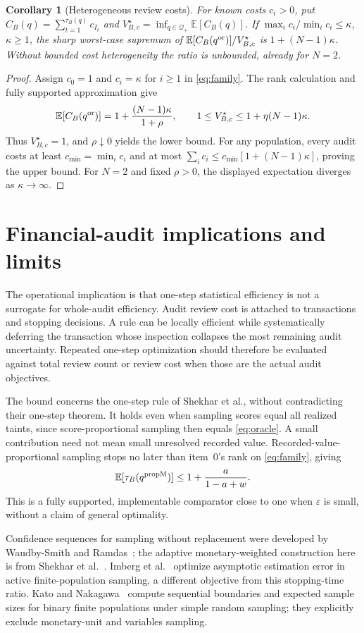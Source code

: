 \documentclass[11pt]{article}
\newtheorem{corollary}[theorem]{Corollary}
\newcommand{\E}{\mathbb{E}}
\begin{document}
\begin{corollary}[Heterogeneous review costs]\label{cor:cost}
For known costs $c_i>0$, put
$C_B(q)=\sum_{t=1}^{\tau_B(q)}c_{I_t}$ and
$V_{B,c}^\star=\inf_{q\in\mathcal Q_+}\E[C_B(q)]$.
If $\max_i c_i/\min_i c_i\le\kappa$, $\kappa\ge1$, the sharp worst-case
supremum of $\E[C_B(q^{\rm or})]/V_{B,c}^\star$ is $1+(N-1)\kappa$.
Without bounded cost heterogeneity the ratio is unbounded, already for $N=2$.
\end{corollary}
\begin{proof}
Assign $c_0=1$ and $c_i=\kappa$ for $i\ge1$ in \eqref{eq:family}.
The rank calculation and fully supported approximation give
\[
 \E[C_B(q^{\rm or})]=1+\frac{(N-1)\kappa}{1+\rho},\qquad
 1\le V_{B,c}^\star\le1+\eta(N-1)\kappa.
\]
Thus $V_{B,c}^\star=1$, and $\rho\downarrow0$ yields the lower bound.
For any population, every audit costs at least $c_{\min}=\min_i c_i$ and
at most $\sum_i c_i\le c_{\min}[1+(N-1)\kappa]$, proving the upper bound.
For $N=2$ and fixed $\rho>0$, the displayed expectation diverges as
$\kappa\to\infty$.
\end{proof}

\section{Financial-audit implications and limits}
The operational implication is that one-step statistical efficiency is not a
surrogate for whole-audit efficiency. Audit review cost is attached to
transactions and stopping decisions. A rule can be locally efficient while
systematically deferring the transaction whose inspection collapses the most
remaining audit uncertainty. Repeated one-step optimization should therefore
be evaluated against total review count or review cost when those are the
actual audit objectives.

The bound concerns the one-step rule of Shekhar et al., without contradicting
their one-step theorem. It holds even when sampling scores equal all realized
taints, since score-proportional sampling then equals \eqref{eq:oracle}.
A small contribution need not mean small unresolved recorded value.
Recorded-value-proportional sampling stops no later than item~0's rank on
\eqref{eq:family}, giving
\[
 \E[\tau_B(q^{\rm propM})]\le1+\frac{a}{1-a+w}.
\]
This is a fully supported, implementable comparator close to one when
$\varepsilon$ is small, without a claim of general optimality.

Confidence sequences for sampling without replacement were developed by
Waudby-Smith and Ramdas~\cite{waudby2020}; the adaptive monetary-weighted
construction here is from Shekhar et al.~\cite{shekhar2023}.
Imberg et al.~\cite{imberg2024} optimize asymptotic estimation error in active
finite-population sampling, a different objective from this stopping-time
ratio. Kato and Nakagawa~\cite{kato2026} compute sequential boundaries and
expected sample sizes for binary finite populations under simple random
sampling; they explicitly exclude monetary-unit and variables sampling.
\end{document}
